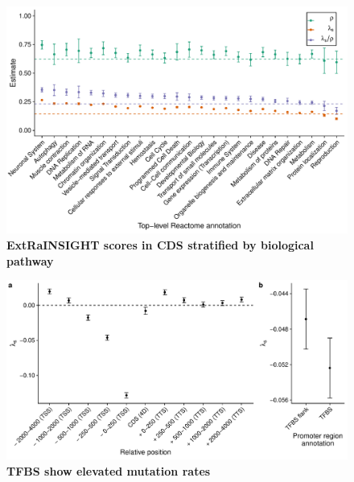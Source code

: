 \documentclass[11pt]{article}
\begin{document}

\begin{figure}[t]
    \centering
    \includegraphics[width=\linewidth]{figures/reactome_cds_ratio.pdf}
    \caption{\textbf{\textbf{ExtRaINSIGHT scores in CDS stratified by biological pathway}}}
    \label{fig:reactome}
\end{figure}

\clearpage 


\begin{figure}[t]
    \centering
    \includegraphics[width=\linewidth]{figures/excess_mutation_rate.pdf}
    \caption{\textbf{\textbf{TFBS show elevated mutation rates}}}
    \label{fig:mutation_model_misspec}
\end{figure}
\end{document}
